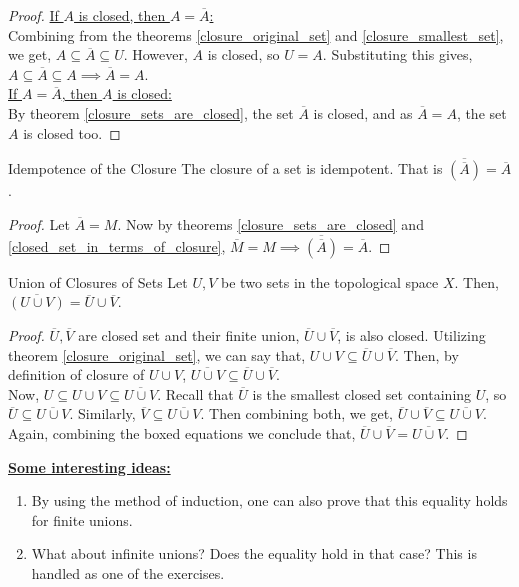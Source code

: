 \begin{proof}
    \underline{If $A$ is closed, then $A=\overline{A}$:}\\
    Combining from  the theorems \eqref{closure_original_set} and \eqref{closure_smallest_set}, we get, $A\subseteq \overline{A}\subseteq U$. However, $A$ is closed, so $U=A$. Substituting this gives, $A\subseteq \overline{A}\subseteq A\implies \overline{A}=A$.\\
    \underline{If $A=\overline{A}$, then $A$ is closed:}\\
    By theorem \eqref{closure_sets_are_closed}, the set $\overline{A}$ is closed, and as $\overline{A}=A$, the set $A$ is closed too.
\end{proof}
\begin{Theorem}{Idempotence of the Closure}\label{closure_idempotent}
    The closure of a set is idempotent. That is $\overline{(\overline{A})}=\overline{A}$.
\end{Theorem}
\begin{proof}
    Let $\overline{A}=M$. Now by theorems \eqref{closure_sets_are_closed} and \eqref{closed_set_in_terms_of_closure}, $\overline{M}=M\implies \overline{(\overline{A})}=\overline{A}$.
\end{proof}
\begin{Theorem}{Union of Closures of Sets}\label{closure_union}
    Let $U, V$ be two sets in the topological space $X$. Then, $\overline{(U\cup V)}=\overline{U}\cup\overline{V}$.
\end{Theorem}
\begin{proof}
    $\overline{U}, \overline{V}$ are closed set and their finite union, $\overline{U}\cup\overline{V}$, is also closed. Utilizing theorem \eqref{closure_original_set}, we can say that, $U\cup V\subseteq \overline{U}\cup\overline{V}$. Then, by definition of closure of $U\cup V$, $\boxed{\overline{U\cup V}\subseteq\overline{U}\cup\overline{V}}$.\\
    Now, $U\subseteq U\cup V\subseteq\overline{U\cup V}$. Recall that $\overline{U}$ is the smallest closed set containing $U$, so $\overline{U}\subseteq\overline{U\cup V}$. Similarly, $\overline{V}\subseteq\overline{U\cup V}$. Then combining both, we get, $\boxed{\overline{U}\cup\overline{V}\subseteq\overline{U\cup V}}$.\\
    Again, combining the boxed equations we conclude that, $\overline{U}\cup\overline{V}=\overline{U\cup V}$.
\end{proof}
\noindent\textbf{\underline{Some interesting ideas:}}
\begin{enumerate}
    \item By using the method of induction, one can also prove that this equality holds for finite unions.
    \item What about infinite unions? Does the equality hold in that case? This is handled as one of the exercises.
\end{enumerate}
